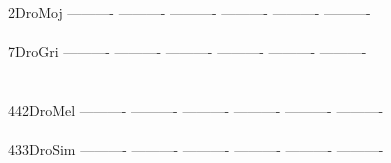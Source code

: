 \documentclass[11pt,twoside,reqno,a4paper]{article}
\begin{document}
{2\hspace*{4\charwidth}DroMoj	----------	----------	----------	----------	----------	----------	\\
\hspace*{5\charwidth}\hspace*{7\charwidth}\hspace*{1\charwidth}\hspace*{1\charwidth}\hspace*{1\charwidth}\hspace*{1\charwidth}\hspace*{1\charwidth}\hspace*{1\charwidth}\\
7\hspace*{4\charwidth}DroGri	----------	----------	----------	----------	----------	----------	\\
\hspace*{5\charwidth}\hspace*{7\charwidth}\hspace*{1\charwidth}\hspace*{1\charwidth}\hspace*{1\charwidth}\hspace*{1\charwidth}\hspace*{1\charwidth}\hspace*{1\charwidth}\\
\\
442\hspace*{2\charwidth}DroMel	----------	----------	----------	----------	----------	----------	\\
\hspace*{5\charwidth}\hspace*{7\charwidth}\hspace*{1\charwidth}\hspace*{1\charwidth}\hspace*{1\charwidth}\hspace*{1\charwidth}\hspace*{1\charwidth}\hspace*{1\charwidth}\\
433\hspace*{2\charwidth}DroSim	----------	----------	----------	----------	----------	----------	\\
\hspace*{5\charwidth}\hspace*{7\charwidth}\hspace*{1\charwidth}\hspace*{1\charwidth}\hspace*{1\charwidth}\hspace*{1\charwidth}\hspace*{1\charwidth}\hspace*{1\charwidth}\\
}
\end{document}
